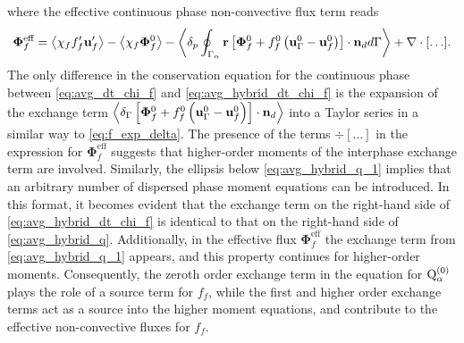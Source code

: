 where the effective continuous phase non-convective flux term reads 
\begin{align}
    \mathbf{\Phi}_f^\text{eff}
    = \avg{\chi_f f_f' \textbf{u}_f'}
    - \avg{\chi_f \bm\Phi_f^0}
    - \pSavg{\textbf{r}\left[
        \mathbf{\Phi}_f^0
        + f_f^0
        \left(
            \textbf{u}_\Gamma^0
            - \textbf{u}_f^0
        \right)
    \right]
    \cdot \textbf{n}_d}
    + \div[\ldots].
    \label{eq:effective_stress}
\end{align}
The only difference in the conservation equation for the continuous phase between \eqref{eq:avg_dt_chi_f} and \eqref{eq:avg_hybrid_dt_chi_f} is the expansion of the exchange term $\left<\delta_\Gamma \left[
    \mathbf{\Phi}_f^0
    + f_f^0
    \left(
        \textbf{u}_\Gamma ^0
        - \textbf{u}_f^0
    \right)
\right]
\cdot \textbf{n}_d\right>$
 into a Taylor series in a similar way to \ref{eq:f_exp_delta}. 
The presence of the terms $\div[\ldots]$ in the expression for  $\mathbf{\Phi}_f^\text{eff}$ suggests that higher-order moments of the interphase exchange term are involved.
Similarly, the ellipsis below \ref{eq:avg_hybrid_q_1} implies that an arbitrary number of dispersed phase moment equations can be introduced. In this format, it becomes evident that the exchange term on the right-hand side of \ref{eq:avg_hybrid_dt_chi_f} is identical to that on the right-hand side of \ref{eq:avg_hybrid_q}. 
Additionally, in the effective flux $\mathbf{\Phi}_f^\text{eff}$ the exchange term from  \ref{eq:avg_hybrid_q_1} appears, and this property continues for higher-order moments.  
Consequently, the zeroth order exchange term in the equation for $\text Q_\alpha^{(0)}$ plays the role of a source term for $f_f$, while the first and higher order exchange terms act as a source into the higher moment equations, and contribute to the effective non-convective fluxes for $f_f$. 



